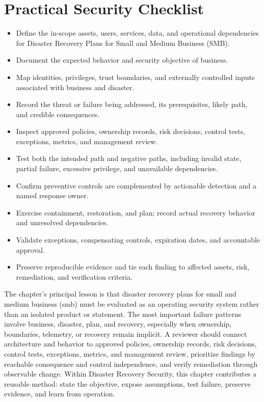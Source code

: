 \documentclass[11pt]{article}
\begin{document}
\section*{Practical Security Checklist}
\begin{itemize}[label=$\square$]
\item Define the in-scope assets, users, services, data, and operational dependencies for Disaster Recovery Plans for Small and Medium Business (SMB).
\item Document the expected behavior and security objective of business.
\item Map identities, privileges, trust boundaries, and externally controlled inputs associated with business and disaster.
\item Record the threat or failure being addressed, its prerequisites, likely path, and credible consequences.
\item Inspect approved policies, ownership records, risk decisions, control tests, exceptions, metrics, and management review.
\item Test both the intended path and negative paths, including invalid state, partial failure, excessive privilege, and unavailable dependencies.
\item Confirm preventive controls are complemented by actionable detection and a named response owner.
\item Exercise containment, restoration, and plan; record actual recovery behavior and unresolved dependencies.
\item Validate exceptions, compensating controls, expiration dates, and accountable approval.
\item Preserve reproducible evidence and tie each finding to affected assets, risk, remediation, and verification criteria.
\end{itemize}
\begin{synthesisbox}
The chapter's principal lesson is that disaster recovery plans for small and medium business (smb) must be evaluated as an operating security system rather than an isolated product or statement. The most important failure patterns involve business, disaster, plan, and recovery, especially when ownership, boundaries, telemetry, or recovery remain implicit. A reviewer should connect architecture and behavior to approved policies, ownership records, risk decisions, control tests, exceptions, metrics, and management review, prioritize findings by reachable consequence and control independence, and verify remediation through observable change. Within Disaster Recovery Security, this chapter contributes a reusable method: state the objective, expose assumptions, test failure, preserve evidence, and learn from operation.
\end{synthesisbox}
\end{document}
